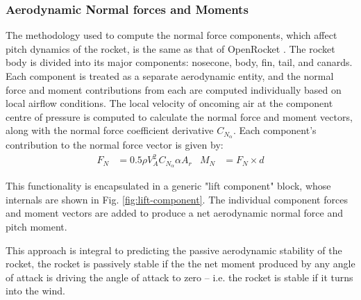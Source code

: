 \subsubsection{Aerodynamic Normal forces and Moments}
The methodology used to compute the normal force components, which affect pitch dynamics of the rocket, is the same as that of OpenRocket \cite[sec. 3.2.1]{or-manual}. The rocket body is divided into its major components: nosecone, body, fin, tail, and canards.
Each component is treated as a separate aerodynamic entity, and the normal force and moment contributions from each are computed individually based on local airflow conditions.
The local velocity of oncoming air at the component centre of pressure is computed to calculate the normal force and moment vectors, along with the normal force coefficient derivative $C_{N_\alpha}$.
Each component's contribution to the normal force vector is given by:
\begin{align}
    F_{N} &= 0.5 \rho V_A^2 C_{N_\alpha} \alpha A_r 
    & 
    M_{N} &= F_{N} \times d
\end{align}

This functionality is encapsulated in a generic "lift component" block, whose internals are shown in Fig. \ref{fig:lift-component}.
The individual component forces and moment vectors are added to produce a net aerodynamic normal force and pitch moment.

This approach is integral to predicting the passive aerodynamic stability of the rocket, the rocket is passively stable if the the net moment produced by any angle of attack is driving the angle of attack to zero -- i.e. the rocket is stable if it turns into the wind.

